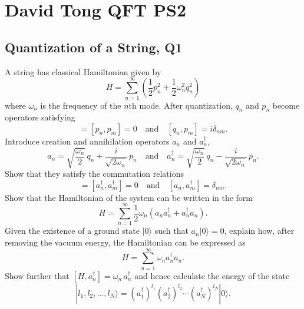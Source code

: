 \section{David Tong QFT PS2}

\subsection{Quantization of a String, Q1}

A string has classical Hamiltonian given by
\begin{equation}
    H = \sum_{n=1}^{\infty}\left(\frac{1}{2}p_n^2 + \frac{1}{2}\omega_n^2 q_n^2\right)
\end{equation}
where $\omega_n$ is the frequency of the $n$th mode. After quantization, $q_n$ and $p_n$ become operators satisfying
\begin{equation}
    [q_n, q_m] = [p_n, p_m] = 0 \quad \text{and} \quad [q_n, p_m] = i\delta_{nm}.
\end{equation}
Introduce creation and annihilation operators $a_n$ and $a_n^\dagger$,
\begin{equation}
    a_n = \sqrt{\frac{\omega_n}{2}}\,q_n + \frac{i}{\sqrt{2\omega_n}}\,p_n \quad \text{and} \quad a_n^\dagger = \sqrt{\frac{\omega_n}{2}}\,q_n - \frac{i}{\sqrt{2\omega_n}}\,p_n.
\end{equation}
Show that they satisfy the commutation relations
\begin{equation}
    [a_n, a_m] = [a_n^\dagger, a_m^\dagger] = 0 \quad \text{and} \quad [a_n, a_m^\dagger] = \delta_{nm}.
\end{equation}
Show that the Hamiltonian of the system can be written in the form
\begin{equation}
    H = \sum_{n=1}^{\infty} \frac{1}{2}\omega_n\left(a_n a_n^\dagger + a_n^\dagger a_n\right).
\end{equation}
Given the existence of a ground state $|0\rangle$ such that $a_n|0\rangle = 0$, explain how, after removing the vacuum energy, the Hamiltonian can be expressed as
\begin{equation}
    H = \sum_{n=1}^{\infty}\omega_n a_n^\dagger a_n.
\end{equation}
Show further that $[H, a_n^\dagger] = \omega_n\, a_n^\dagger$ and hence calculate the energy of the state
\begin{equation}
    |l_1, l_2, \ldots, l_N\rangle = \left(a_1^\dagger\right)^{l_1}\left(a_2^\dagger\right)^{l_2}\cdots\left(a_N^\dagger\right)^{l_N}|0\rangle.
\end{equation}
